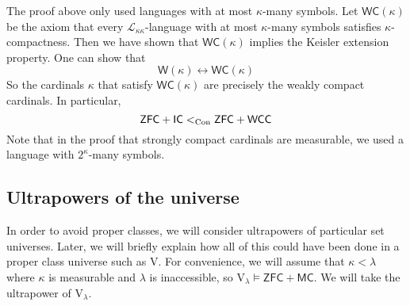 The proof above only used languages with at most \( \kappa \)-many symbols.
Let \( \mathsf{WC}(\kappa) \) be the axiom that every \( \mathcal L_{\kappa\kappa} \)-language with at most \( \kappa \)-many symbols satisfies \( \kappa \)-compactness.
Then we have shown that \( \mathsf{WC}(\kappa) \) implies the Keisler extension property.
One can show that
\[ \mathsf{W}(\kappa) \leftrightarrow \mathsf{WC}(\kappa) \]
So the cardinals \( \kappa \) that satisfy \( \mathsf{WC}(\kappa) \) are precisely the weakly compact cardinals.
In particular,
\[ \mathsf{ZFC} + \mathsf{IC} <_{\operatorname{Con}} \mathsf{ZFC} + \mathsf{WCC} \]
Note that in the proof that strongly compact cardinals are measurable, we used a language with \( 2^\kappa \)-many symbols.

\subsection{Ultrapowers of the universe}
In order to avoid proper classes, we will consider ultrapowers of particular set universes.
Later, we will briefly explain how all of this could have been done in a proper class universe such as \( \mathrm{V} \).
For convenience, we will assume that \( \kappa < \lambda \) where \( \kappa \) is measurable and \( \lambda \) is inaccessible, so \( \mathrm{V}_\lambda \vDash \mathsf{ZFC} + \mathsf{MC} \).
We will take the ultrapower of \( \mathrm{V}_\lambda \).

